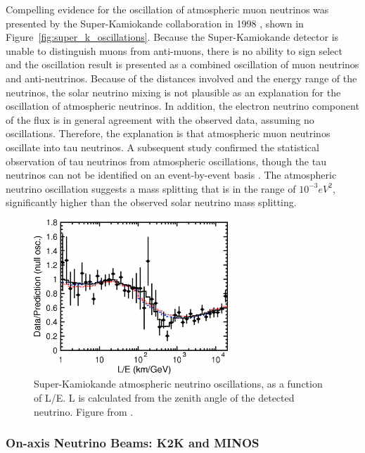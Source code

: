 Compelling evidence for the oscillation of atmospheric muon neutrinos was presented by the Super-Kamiokande collaboration in 1998 \cite{PhysRevLett.81.1562}, shown in Figure~\ref{fig:super_k_oscillations}.  Because the Super-Kamiokande detector is unable to distinguish muons from anti-muons, there is no ability to sign select and the oscillation result is presented as a combined oscillation of muon neutrinos and anti-neutrinos.  Because of the distances involved and the energy range of the neutrinos, the solar neutrino mixing is not plausible as an explanation for the oscillation of atmospheric neutrinos.  In addition, the electron neutrino component of the flux is in general agreement with the observed data, assuming no oscillations.  Therefore, the explanation is that atmospheric muon neutrinos oscillate into tau neutrinos.  A subsequent study confirmed the statistical observation of tau neutrinos from atmospheric oscillations, though the tau neutrinos can not be identified on an event-by-event basis \cite{PhysRevLett.110.181802}.  The atmospheric neutrino oscillation suggests a mass splitting that is in the range of $10^{-3} eV^2$, significantly higher than the observed solar neutrino mass splitting.

\begin{figure}[htbp]
  \centering
  \includegraphics[width=0.65\textwidth]{intro_figures/superk_atmospheric_oscillation.png}
  \caption[Super-K Neutrino Oscillations]{Super-Kamiokande atmospheric neutrino oscillations, as a function of L/E.  L is calculated from the zenith angle of the detected neutrino. Figure from \cite{PhysRevLett.93.101801}.}
  \label{fig:label}
\end{figure}

\subsubsection{On-axis Neutrino Beams: K2K and MINOS}

